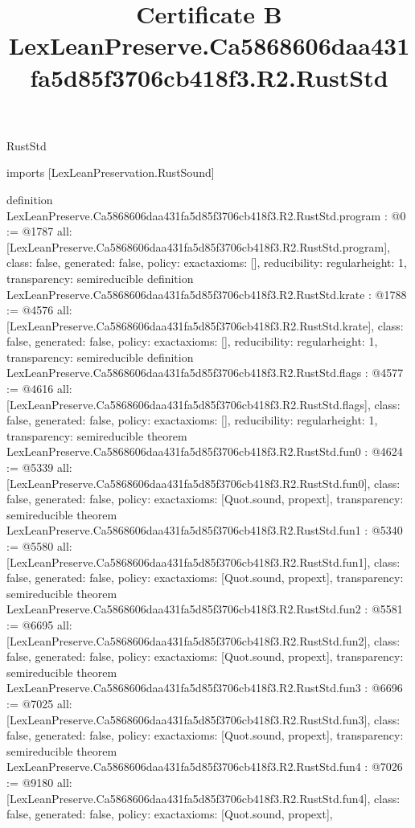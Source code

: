 \begin{lexlean}{RustStd}
\title{Certificate B LexLeanPreserve.Ca5868606daa431fa5d85f3706cb418f3.R2.RustStd}
\begin{coremodule}
imports [LexLeanPreservation.RustSound]

definition LexLeanPreserve.Ca5868606daa431fa5d85f3706cb418f3.R2.RustStd.program : @0 := @1787 {
  all: [LexLeanPreserve.Ca5868606daa431fa5d85f3706cb418f3.R2.RustStd.program],
  class: false,
  generated: false,
  policy: exact{axioms: []},
  reducibility: regular{height: 1},
  transparency: semireducible
}
definition LexLeanPreserve.Ca5868606daa431fa5d85f3706cb418f3.R2.RustStd.krate : @1788 := @4576 {
  all: [LexLeanPreserve.Ca5868606daa431fa5d85f3706cb418f3.R2.RustStd.krate],
  class: false,
  generated: false,
  policy: exact{axioms: []},
  reducibility: regular{height: 1},
  transparency: semireducible
}
definition LexLeanPreserve.Ca5868606daa431fa5d85f3706cb418f3.R2.RustStd.flags : @4577 := @4616 {
  all: [LexLeanPreserve.Ca5868606daa431fa5d85f3706cb418f3.R2.RustStd.flags],
  class: false,
  generated: false,
  policy: exact{axioms: []},
  reducibility: regular{height: 1},
  transparency: semireducible
}
theorem LexLeanPreserve.Ca5868606daa431fa5d85f3706cb418f3.R2.RustStd.fun0 : @4624 := @5339 {
  all: [LexLeanPreserve.Ca5868606daa431fa5d85f3706cb418f3.R2.RustStd.fun0],
  class: false,
  generated: false,
  policy: exact{axioms: [Quot.sound, propext]},
  transparency: semireducible
}
theorem LexLeanPreserve.Ca5868606daa431fa5d85f3706cb418f3.R2.RustStd.fun1 : @5340 := @5580 {
  all: [LexLeanPreserve.Ca5868606daa431fa5d85f3706cb418f3.R2.RustStd.fun1],
  class: false,
  generated: false,
  policy: exact{axioms: [Quot.sound, propext]},
  transparency: semireducible
}
theorem LexLeanPreserve.Ca5868606daa431fa5d85f3706cb418f3.R2.RustStd.fun2 : @5581 := @6695 {
  all: [LexLeanPreserve.Ca5868606daa431fa5d85f3706cb418f3.R2.RustStd.fun2],
  class: false,
  generated: false,
  policy: exact{axioms: [Quot.sound, propext]},
  transparency: semireducible
}
theorem LexLeanPreserve.Ca5868606daa431fa5d85f3706cb418f3.R2.RustStd.fun3 : @6696 := @7025 {
  all: [LexLeanPreserve.Ca5868606daa431fa5d85f3706cb418f3.R2.RustStd.fun3],
  class: false,
  generated: false,
  policy: exact{axioms: [Quot.sound, propext]},
  transparency: semireducible
}
theorem LexLeanPreserve.Ca5868606daa431fa5d85f3706cb418f3.R2.RustStd.fun4 : @7026 := @9180 {
  all: [LexLeanPreserve.Ca5868606daa431fa5d85f3706cb418f3.R2.RustStd.fun4],
  class: false,
  generated: false,
  policy: exact{axioms: [Quot.sound, propext]},
}
\end{coremodule}
\end{lexlean}
